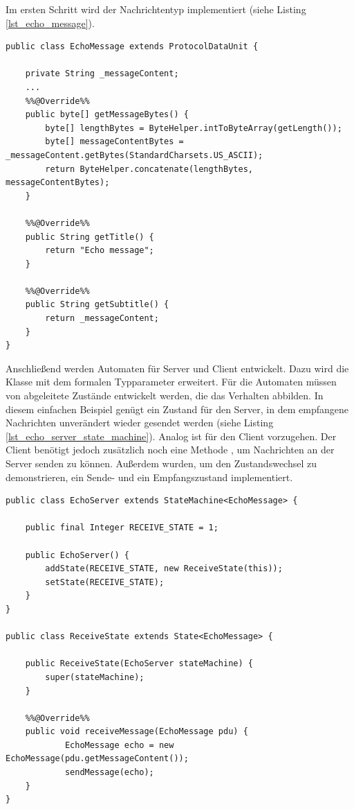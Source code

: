 Im ersten Schritt wird der Nachrichtentyp implementiert (siehe Listing \ref{lst_echo_message}).

\begin{lstlisting}
public class EchoMessage extends ProtocolDataUnit {
	
	private String _messageContent;
	...
	%%@Override%%
	public byte[] getMessageBytes() {
		byte[] lengthBytes = ByteHelper.intToByteArray(getLength());
		byte[] messageContentBytes = _messageContent.getBytes(StandardCharsets.US_ASCII);
		return ByteHelper.concatenate(lengthBytes, messageContentBytes);
	}

	%%@Override%%
	public String getTitle() {
		return "Echo message";
	}

	%%@Override%%
	public String getSubtitle() {
		return _messageContent;
	}
}
\end{lstlisting}

Anschließend werden Automaten für Server und Client entwickelt. Dazu wird die Klasse  mit dem formalen Typparameter  erweitert. Für die Automaten müssen von  abgeleitete Zustände entwickelt werden, die das Verhalten abbilden. In diesem einfachen Beispiel genügt ein Zustand für den Server, in dem empfangene Nachrichten unverändert wieder gesendet werden (siehe Listing \ref{lst_echo_server_state_machine}). Analog ist für den Client vorzugehen. Der Client benötigt jedoch zusätzlich noch eine Methode , um Nachrichten an der Server senden zu können. Außerdem wurden, um den Zustandswechsel zu demonstrieren, ein Sende- und ein Empfangszustand implementiert. 

\begin{lstlisting}[style=java, caption={Implementierung des Serverautomaten}, label=lst_echo_server_state_machine]
public class EchoServer extends StateMachine<EchoMessage> {

	public final Integer RECEIVE_STATE = 1; 
	
	public EchoServer() {
		addState(RECEIVE_STATE, new ReceiveState(this));               
		setState(RECEIVE_STATE);
	}
}

public class ReceiveState extends State<EchoMessage> {

	public ReceiveState(EchoServer stateMachine) {
		super(stateMachine);
	}

	%%@Override%%
	public void receiveMessage(EchoMessage pdu) {
			EchoMessage echo = new EchoMessage(pdu.getMessageContent());
			sendMessage(echo);
	}
}
\end{lstlisting}

